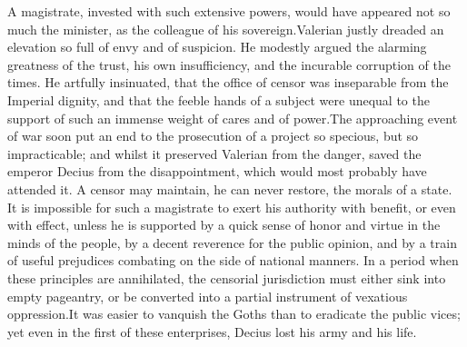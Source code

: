 



A magistrate, invested with such extensive powers, would have
appeared not so much the minister, as the colleague of his
sovereign.\footnotemark[41] Valerian justly dreaded an elevation so full of
envy and of suspicion. He modestly argued the alarming greatness
of the trust, his own insufficiency, and the incurable corruption
of the times. He artfully insinuated, that the office of censor
was inseparable from the Imperial dignity, and that the feeble
hands of a subject were unequal to the support of such an immense
weight of cares and of power.\footnotemark[42] The approaching event of war
soon put an end to the prosecution of a project so specious, but
so impracticable; and whilst it preserved Valerian from the
danger, saved the emperor Decius from the disappointment, which
would most probably have attended it. A censor may maintain, he
can never restore, the morals of a state. It is impossible for
such a magistrate to exert his authority with benefit, or even
with effect, unless he is supported by a quick sense of honor and
virtue in the minds of the people, by a decent reverence for the
public opinion, and by a train of useful prejudices combating on
the side of national manners. In a period when these principles
are annihilated, the censorial jurisdiction must either sink into
empty pageantry, or be converted into a partial instrument of
vexatious oppression.\footnotemark[43] It was easier to vanquish the Goths than
to eradicate the public vices; yet even in the first of these
enterprises, Decius lost his army and his life.


